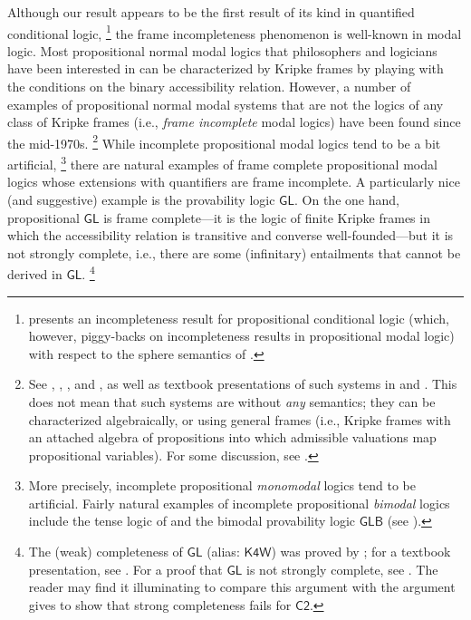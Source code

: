 \documentclass[12pt]{article}
\begin{document}
Although our result appears to be the first result of its kind in quantified conditional logic,%
    \footnote{\cite{Nute1978} presents an incompleteness result for propositional conditional logic (which, however, piggy-backs on incompleteness results in propositional modal logic) with respect to the sphere semantics of \cite{Lewis1973}.
    } %
the frame incompleteness phenomenon is well-known in modal logic. 
Most propositional normal modal logics that philosophers and logicians have been interested in can be characterized by Kripke frames by playing with the conditions on the binary accessibility relation. 
However, a number of  examples of propositional normal modal systems that are not the logics of any class of Kripke frames (i.e., \emph{frame incomplete} modal logics) have been found since the mid-1970s.%
\footnote{
    See \cite{Fine1974incomplete}, \cite{Thomason1974incomplete}, \cite{vanBenthem1978incomplete}, and \cite{BoolosSambin1985incomplete}, as well as textbook presentations of such systems in \cite[Ch.~9]{HughesCresswell1996} and \cite[\S4.4]{Blackburn2001}. 
    This does not mean that such systems are without \emph{any} semantics; they can be characterized algebraically, or using general frames (i.e., Kripke frames with an attached algebra of propositions into which admissible valuations map propositional variables). 
    For some discussion, see \cite[Ch.~5]{Blackburn2001}.
    } %
While incomplete propositional modal logics tend to be a bit artificial,%
\footnote{
    More precisely, incomplete propositional \emph{monomodal} logics tend to be artificial. Fairly natural examples of incomplete propositional \emph{bimodal} logics include the tense logic of \cite[\S4]{Thomason1972tense} and the bimodal provability logic $\mathsf{GLB}$ (see \cite[pp.~193--194]{Boolos1993provability}).
    } %
there are natural examples of frame complete propositional modal logics whose extensions with quantifiers are frame incomplete. 
A particularly nice (and suggestive) example is the provability logic $\mathsf{GL}$. 
On the one hand, propositional $\mathsf{GL}$ is frame complete---it is the logic of finite Kripke frames in which the accessibility relation is transitive and converse well-founded---but it is not strongly complete, i.e., there are some (infinitary) entailments that cannot be derived in $\mathsf{GL}$.%
\footnote{
    The (weak) completeness of $\mathsf{GL}$ (alias: $\mathsf{K4W}$) was proved by \cite[pp.~84--89]{Segerberg1971Dissertation}; for a textbook presentation, see \cite[Chs.~4--5]{Boolos1993provability}. For a proof that $\mathsf{GL}$ is not strongly complete, see \cite[p.~211]{Blackburn2001}. The reader may find it illuminating to compare this argument with the argument \cite{kocurek2025stalnaker} gives to show that strong completeness fails for $\mathsf{C2}$.
    } %
\end{document}
